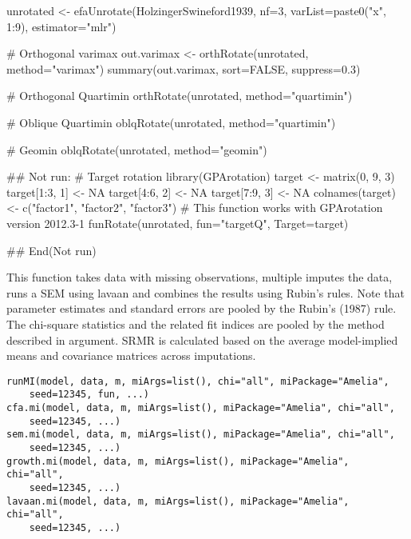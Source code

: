 \documentclass[a4paper]{book}
\begin{document}
%
\begin{Examples}
\begin{ExampleCode}
unrotated <- efaUnrotate(HolzingerSwineford1939, nf=3, varList=paste0("x", 1:9), estimator="mlr")

# Orthogonal varimax
out.varimax <- orthRotate(unrotated, method="varimax")
summary(out.varimax, sort=FALSE, suppress=0.3)

# Orthogonal Quartimin
orthRotate(unrotated, method="quartimin")

# Oblique Quartimin
oblqRotate(unrotated, method="quartimin")

# Geomin
oblqRotate(unrotated, method="geomin")

## Not run: 
# Target rotation
library(GPArotation)
target <- matrix(0, 9, 3)
target[1:3, 1] <- NA
target[4:6, 2] <- NA
target[7:9, 3] <- NA
colnames(target) <- c("factor1", "factor2", "factor3")
# This function works with GPArotation version 2012.3-1
funRotate(unrotated, fun="targetQ", Target=target) 

## End(Not run)
\end{ExampleCode}
\end{Examples}
%
\begin{Description}\relax
This function takes data with missing observations, multiple imputes the data, runs a SEM using lavaan and combines the results using Rubin's rules. Note that parameter estimates and standard errors are pooled by the Rubin's (1987) rule. The chi-square statistics and the related fit indices are pooled by the method described in  argument. SRMR is calculated based on the average model-implied means and covariance matrices across imputations.
\end{Description}
%
\begin{Usage}
\begin{verbatim}
runMI(model, data, m, miArgs=list(), chi="all", miPackage="Amelia", 
	seed=12345, fun, ...) 
cfa.mi(model, data, m, miArgs=list(), miPackage="Amelia", chi="all", 
	seed=12345, ...)
sem.mi(model, data, m, miArgs=list(), miPackage="Amelia", chi="all",  
	seed=12345, ...)
growth.mi(model, data, m, miArgs=list(), miPackage="Amelia", chi="all", 
	seed=12345, ...)
lavaan.mi(model, data, m, miArgs=list(), miPackage="Amelia", chi="all", 
	seed=12345, ...)
\end{verbatim}
\end{Usage}
\end{document}
